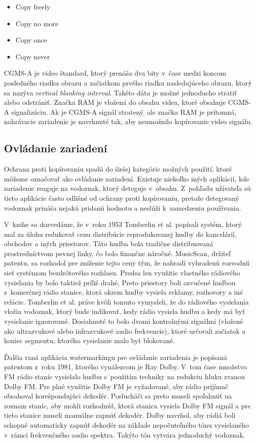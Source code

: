 \begin{itemize}
\item Copy freely
\item Copy no more
\item Copy once
\item Copy never
\end{itemize}

CGMS-A je video štandard, ktorý prenáša dva bity v~čase medzi koncom posledného riadku obrazu a začiatkom prvého riadku nasledujúceho obrazu, ktorý sa nazýva {\it vertical blanking interval}. Takéto dáta je možné jednoducho stratiť alebo odstrániť. Značka RAM je vložená do obsahu videa, ktoré obsahuje CGMS-A signalizáciu. Ak je CGMS-A signál stratený, ale značka RAM je prítomná, nahrávacie zariadenie je navrhnuté tak, aby neumožnilo kopírovanie video signálu. \cite{Cox}

\subsection{Ovládanie zariadení}
Ochrana proti kopírovaniu spadá do širšej kategórie možných použití, ktoré môžeme označovať ako ovládanie zariadení. Existuje niekoľko iných aplikácií, kde zariadenie reaguje na vodoznak, ktorý deteguje v~obsahu. Z~pohľadu užívateľa sú tieto aplikácie často odlišné od ochrany proti kopírovaniu, pretože detegovaný vodoznak prináša nejakú pridanú hodnotu a neslúži k~zamedzeniu používania.

V~knihe \cite{Cox} sa dozvedáme, že v~roku 1953 Tomberlin et al. popísali systém, ktorý mal za úlohu redukovať cenu distribúcie reprodukovanej hudby do kancelárií, obchodov a iných priestorov. Táto hudba bola tradične distribuovaná prostredníctvom pevnej linky, čo bolo finančne náročné. MusicScan, držiteľ patentu, sa rozhodol pre zníženie tejto ceny tým, že nahradí vyhradenú rozvodnú sieť systémom bezdrôtového rozhlasu. Predsa len využitie vlastného rádiového vysielania by bolo taktiež príliš drahé. Preto priestory boli ozvučené hudbou z~komerčnej rádio stanice, ktorá okrem hudby vysiela reklamy, rozhovory a iné relácie. Tomberlin et al. práve kvôli tomuto vymysleli, že do rádiového vysielania vložia vodoznak, ktorý bude indikovať, kedy rádio vysiela hudbu a kedy má byť vysielanie ignorované. Dosiahnuté to bolo dvomi kontrolnými signálmi (vložené ako ultrazvukové alebo infrazvukové audio frekvencie), ktoré určovali začiatok a koniec segmentu, ktorého vysielanie malo byť blokované.

Ďalšia raná aplikácia watermarkingu pre ovládanie zariadenia je popísaná patentom z~roku 1981, ktorého vynálezcom je Ray Dolby. V~tom čase množstvo FM rádio staníc vysielalo hudbu s~použitím techniky na redukciu hluku zvanou Dolby FM. Pre plné využitie Dolby FM je vyžadované, aby rádio prijímač obsahoval korešpondujúci dekodér. Poslucháči sa preto museli spoľahnúť na zoznam staníc, aby mohli rozhodnúť, ktorá stanica vysiela Dolby FM signál a pre tieto stanice museli manuálne zapnúť dekodér. Dolby navrhol, aby rádiá boli schopné automaticky zapnúť dekodér na základe nepočuteľného tónu vysielaného v~rámci frekvenčného audio spektra. Takýto tón vytvára jednoduchý vodoznak.

